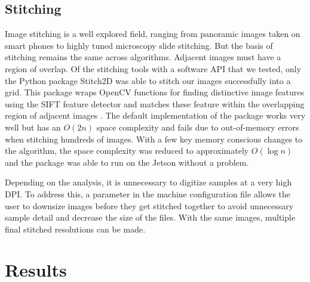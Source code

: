 \documentclass[a4paper,12pt]{article}
\begin{document}
\subsection{Stitching}

Image stitching is a well explored field, ranging from panoramic images taken on smart phones to highly tuned microscopy slide stitching. 
But the basis of stitching remains the same across algorithms. Adjacent images must have a region of overlap. 
Of the stitching tools with a software API that we tested, only the Python package Stitch2D was able to stitch our images successfully into a grid. %
This package wraps OpenCV functions for finding distinctive image features using the SIFT feature detector and matches these feature within the overlapping region of adjacent images \citep{lowe_distinctive_2004}. 
The default implementation of the package works very well but has an $O(2n)$ space complexity and fails due to out-of-memory errors when stitching hundreds of images. %
With a few key memory conscious changes to the algorithm, the space complexity was reduced to approximately $O(\log{n})$ and the package was able to run on the Jetson without a problem. 

Depending on the analysis, it is unnecessary to digitize samples at a very high DPI. To address this, a parameter in the machine configuration file 
allows the user to downsize images before they get stitched together to avoid unnecessary sample detail and decrease the size of the files.
With the same images, multiple final stitched resolutions can be made. 

\section{Results}
\end{document}
